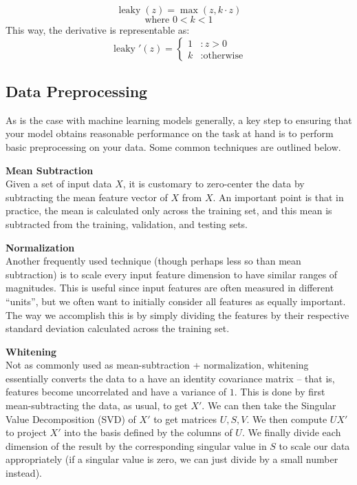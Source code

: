 \documentclass{tufte-handout}
\begin{document}
$$\operatorname{leaky}(z) = \operatorname{max}(z, k\cdot z)$$
$$\text{where } 0<k<1$$
This way, the derivative is representable as:
\begin{displaymath}
    \operatorname{leaky}'(z) = \left\{
     \begin{array}{cl}
       1 & : z > 0\\
       k & : \text{otherwise}
     \end{array}
   \right.
\end{displaymath} 

\subsection{Data Preprocessing}
As is the case with machine learning models generally, a key step to ensuring that your model obtains reasonable performance on the task at hand is to perform basic preprocessing on your data. Some common techniques are outlined below.\\
\vspace{6mm}

\noindent\textbf{Mean Subtraction}\\

\noindent{}Given a set of input data $X$, it is customary to zero-center the data by subtracting the mean feature vector of $X$ from $X$. An important point is that in practice, the mean is calculated only across the training set, and this mean is subtracted from the training, validation, and testing sets.\\
\vspace{6mm}

\noindent\textbf{Normalization}\\

\noindent{}Another frequently used technique (though perhaps less so than mean subtraction) is to scale every input feature dimension to have similar ranges of magnitudes. This is useful since input features are often measured in different ``units'', but we often want to initially consider all features as equally important. The way we accomplish this is by simply dividing the features by their respective standard deviation calculated across the training set.\\
\vspace{6mm}

\noindent\textbf{Whitening}\\

\noindent{}Not as commonly used as mean-subtraction + normalization, whitening essentially converts the data to a have an identity covariance matrix -- that is, features become uncorrelated and have a variance of $1$.  This is done by first mean-subtracting the data, as usual, to get $X'$. We can then take the Singular Value Decomposition (SVD) of $X'$ to get matrices $U, S, V$. We then compute $UX'$ to project  $X'$ into the basis defined by the columns of $U$. We finally divide each dimension of the result by the corresponding singular value in $S$ to scale our data appropriately (if a singular value is zero, we can just divide by a small number instead).
\end{document}
